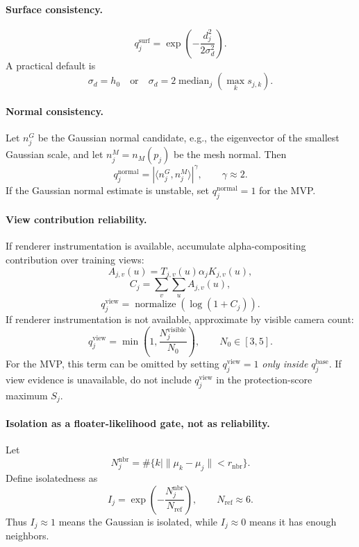 \documentclass[11pt,a4paper]{article}
\newcommand{\normalize}{\operatorname{normalize}}
\begin{document}
\paragraph{Surface consistency.}
\[
q_j^{\mathrm{surf}}=\exp\left(-\frac{d_j^2}{2\sigma_d^2}\right).
\]
A practical default is
\[
\sigma_d=h_0
\quad\text{or}\quad
\sigma_d=2\operatorname{median}_j(\max_k s_{j,k}).
\]

\paragraph{Normal consistency.}
Let $n_j^G$ be the Gaussian normal candidate, e.g., the eigenvector of the smallest Gaussian scale, and let $n_j^M=n_M(p_j)$ be the mesh normal. Then
\[
q_j^{\mathrm{normal}}=|\langle n_j^G,n_j^M\rangle|^\gamma,
\qquad \gamma\approx 2.
\]
If the Gaussian normal estimate is unstable, set $q_j^{\mathrm{normal}}=1$ for the MVP.

\paragraph{View contribution reliability.}
If renderer instrumentation is available, accumulate alpha-compositing contribution over training views:
\[
A_{j,v}(u)=T_{j,v}(u)\alpha_jK_{j,v}(u),
\]
\[
C_j=\sum_v\sum_u A_{j,v}(u),
\]
\[
q_j^{\mathrm{view}}=\normalize\left(\log(1+C_j)\right).
\]
If renderer instrumentation is not available, approximate by visible camera count:
\[
q_j^{\mathrm{view}}=\min\left(1,\frac{N_j^{\mathrm{visible}}}{N_0}\right),
\qquad N_0\in[3,5].
\]
For the MVP, this term can be omitted by setting $q_j^{\mathrm{view}}=1$ \emph{only inside} $q_j^{\mathrm{base}}$. If view evidence is unavailable, do not include $q_j^{\mathrm{view}}$ in the protection-score maximum $S_j$.

\paragraph{Isolation as a floater-likelihood gate, not as reliability.}
Let
\[
N_j^{\mathrm{nbr}}=\#\{k\mid \|\mu_k-\mu_j\|<r_{\mathrm{nbr}}\}.
\]
Define isolatedness as
\[
I_j=\exp\left(-\frac{N_j^{\mathrm{nbr}}}{N_{\mathrm{ref}}}\right),
\qquad N_{\mathrm{ref}}\approx 6.
\]
Thus $I_j\approx 1$ means the Gaussian is isolated, while $I_j\approx 0$ means it has enough neighbors.
\end{document}
